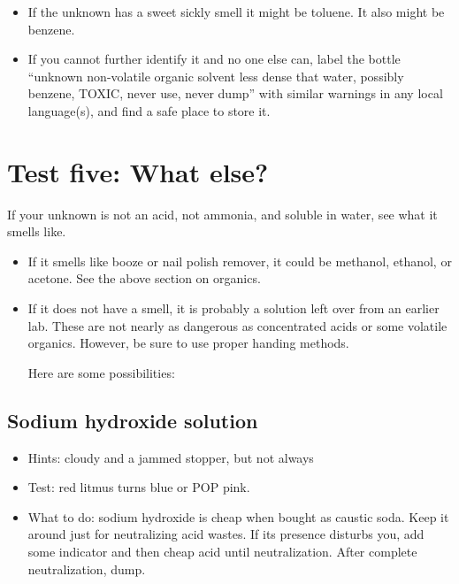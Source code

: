 \begin{itemize}
\item If the unknown has a sweet sickly smell it might be toluene. 
It also might be benzene. 
\item If you cannot further identify it and no one else can, 
label the bottle ``unknown non-volatile organic solvent 
less dense that water, 
possibly benzene, 
TOXIC, 
never use, 
never dump'' with similar warnings in any local language(s), 
and find a safe place to store it.
\end{itemize}

\section{Test five: What else?}
\label{sec:whatelse}
If your unknown is not an acid, 
not ammonia, 
and soluble in water, 
see what it smells like. 
\begin{itemize}
\item If it smells like booze or nail polish remover, 
it could be methanol, 
ethanol, 
or acetone. 
See the above section on organics. 
\item If it does not have a smell, 
it is probably a solution left over from an earlier lab. 
These are not nearly as dangerous as concentrated acids 
or some volatile organics. 
However, 
be sure to use proper handing methods. 

Here are some possibilities:
\end{itemize}

\subsection{Sodium hydroxide solution} 

\begin{itemize}

\item{Hints: cloudy and a jammed stopper, 
but not always}

\item{Test: red litmus turns blue or POP pink.}

\item{What to do: sodium hydroxide is cheap when bought as caustic soda. 
Keep it around just for neutralizing acid wastes. 
If its presence disturbs you, 
add some indicator and then cheap acid until neutralization. 
After complete neutralization, 
dump.}

\end{itemize}


